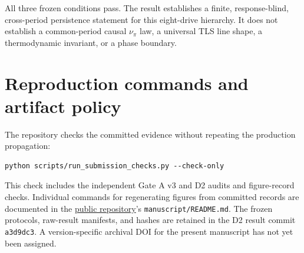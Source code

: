\documentclass[11pt]{article}
\begin{document}
All three frozen conditions pass. The result establishes a finite, response-blind, cross-period persistence statement for this eight-drive hierarchy. It does not establish a common-period causal $\nu_\pi$ law, a universal TLS line shape, a thermodynamic invariant, or a phase boundary.

\section{Reproduction commands and artifact policy}
\label{sec:supp-reproduction}

The repository checks the committed evidence without repeating the production propagation:
\begin{verbatim}
python scripts/run_submission_checks.py --check-only
\end{verbatim}
This check includes the independent Gate A v3 and D2 audits and figure-record checks. Individual commands for regenerating figures from committed records are documented in the \href{https://github.com/666888rwy-bit/floquet-tls-pi-edge-tls}{public repository}'s \texttt{manuscript/README.md}. The frozen protocols, raw-result manifests, and hashes are retained in the D2 result commit \texttt{a3d9dc3}. A version-specific archival DOI for the present manuscript has not yet been assigned.
\end{document}
